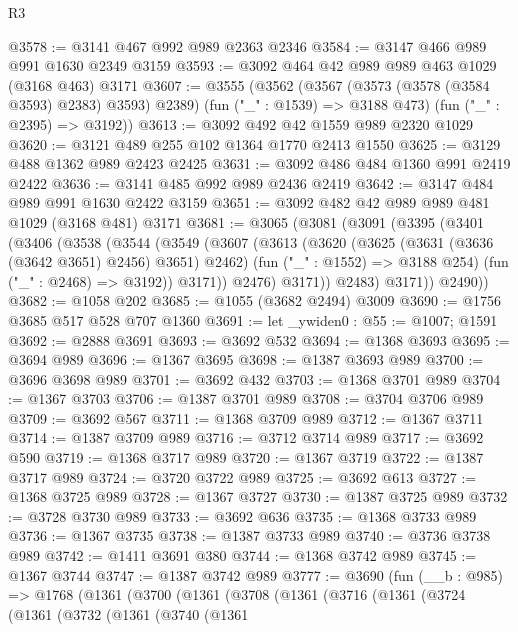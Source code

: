 \begin{lexlean}{R3}
\begin{coremodule}
@3578 := @3141 @467 @992 @989 @2363 @2346
@3584 := @3147 @466 @989 @991 @1630 @2349 @3159
@3593 := @3092 @464 @42 @989 @989 @463 @1029 (@3168 @463) @3171
@3607 := @3555
    (@3562
      (@3567 (@3573 (@3578 (@3584 @3593) @2383) @3593) @2389)
      (fun ("_" : @1539) => @3188 @473)
      (fun ("_" : @2395) => @3192))
@3613 := @3092 @492 @42 @1559 @989 @2320 @1029
@3620 := @3121 @489 @255 @102 @1364 @1770 @2413 @1550
@3625 := @3129 @488 @1362 @989 @2423 @2425
@3631 := @3092 @486 @484 @1360 @991 @2419 @2422
@3636 := @3141 @485 @992 @989 @2436 @2419
@3642 := @3147 @484 @989 @991 @1630 @2422 @3159
@3651 := @3092 @482 @42 @989 @989 @481 @1029 (@3168 @481) @3171
@3681 := @3065
    (@3081
      (@3091
        (@3395
          (@3401
            (@3406
              (@3538
                (@3544
                  (@3549
                    (@3607
                      (@3613
                        (@3620
                          (@3625 (@3631 (@3636 (@3642 @3651) @2456) @3651) @2462)
                          (fun ("_" : @1552) => @3188 @254)
                          (fun ("_" : @2468) => @3192))
                        @3171))
                    @2476)
                  @3171))
              @2483)
            @3171))
        @2490))
@3682 := @1058 @202
@3685 := @1055 (@3682 @2494) @3009
@3690 := @1756 @3685 @517 @528 @707 @1360
@3691 := let _ywiden0 : @55 := @1007; @1591
@3692 := @2888 @3691
@3693 := @3692 @532
@3694 := @1368 @3693
@3695 := @3694 @989
@3696 := @1367 @3695
@3698 := @1387 @3693 @989
@3700 := @3696 @3698 @989
@3701 := @3692 @432
@3703 := @1368 @3701 @989
@3704 := @1367 @3703
@3706 := @1387 @3701 @989
@3708 := @3704 @3706 @989
@3709 := @3692 @567
@3711 := @1368 @3709 @989
@3712 := @1367 @3711
@3714 := @1387 @3709 @989
@3716 := @3712 @3714 @989
@3717 := @3692 @590
@3719 := @1368 @3717 @989
@3720 := @1367 @3719
@3722 := @1387 @3717 @989
@3724 := @3720 @3722 @989
@3725 := @3692 @613
@3727 := @1368 @3725 @989
@3728 := @1367 @3727
@3730 := @1387 @3725 @989
@3732 := @3728 @3730 @989
@3733 := @3692 @636
@3735 := @1368 @3733 @989
@3736 := @1367 @3735
@3738 := @1387 @3733 @989
@3740 := @3736 @3738 @989
@3742 := @1411 @3691 @380
@3744 := @1368 @3742 @989
@3745 := @1367 @3744
@3747 := @1387 @3742 @989
@3777 := @3690
    (fun (__b : @985) =>
    @1768
      (@1361
        (@3700
          (@1361
            (@3708
              (@1361
                (@3716
                  (@1361
                    (@3724
                      (@1361
                        (@3732
                          (@1361
                            (@3740
                              (@1361

\end{coremodule}
\end{lexlean}
